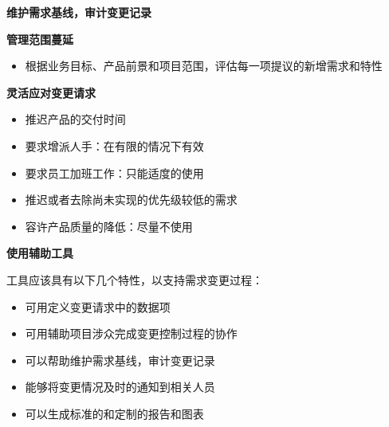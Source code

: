 \textbf{维护需求基线，审计变更记录}

\textbf{管理范围蔓延}
\begin{itemize}
    \item 根据业务目标、产品前景和项目范围，评估每一项提议的新增需求和特性
\end{itemize}

\textbf{灵活应对变更请求}
\vspace{-0.8em}
\begin{multicols}{2}
    \begin{itemize}
        \item 推迟产品的交付时间
        \item 要求增派人手：在有限的情况下有效
        \item 要求员工加班工作：只能适度的使用
        \item 推迟或者去除尚未实现的优先级较低的需求
        \item 容许产品质量的降低：尽量不使用
    \end{itemize}
\end{multicols}
\vspace{-1em}

\textbf{使用辅助工具}

工具应该具有以下几个特性，以支持需求变更过程：
\vspace{-0.8em}
\begin{multicols}{2}
    \begin{itemize}
        \item 可用定义变更请求中的数据项
        \item 可用辅助项目涉众完成变更控制过程的协作
        \item 可以帮助维护需求基线，审计变更记录
        \item 能够将变更情况及时的通知到相关人员
        \item 可以生成标准的和定制的报告和图表 
    \end{itemize}
\end{multicols}
\vspace{-1em}


